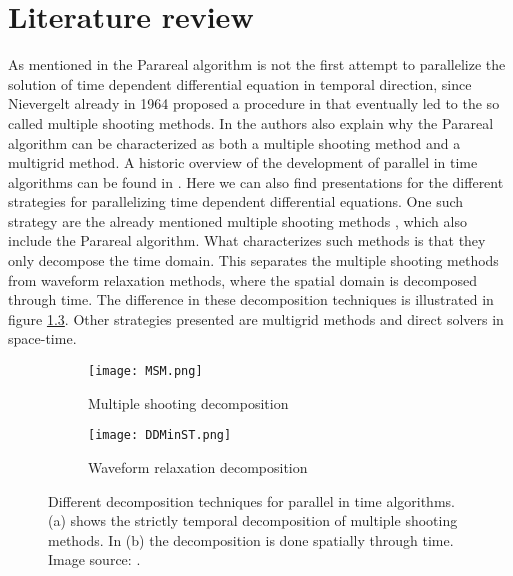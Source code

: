 \chapter{Literature review} \label{lit_chap}
As mentioned in \cite{gander2007superlinear} the Parareal algorithm is not the first attempt to parallelize the solution of time dependent differential equation in temporal direction, since Nievergelt already in 1964 proposed a procedure in \cite{nievergelt1964parallel} that eventually led to the so called multiple shooting methods. In \cite{gander2007superlinear} the authors also explain why the Parareal algorithm can be characterized as both a multiple shooting method and a multigrid method. A historic overview of the development of parallel in time algorithms can be found in \cite{gander201550}. Here we can also find presentations for the different strategies for parallelizing time dependent differential equations. One such strategy are the already mentioned multiple shooting methods \cite{nievergelt1964parallel,bellen1989parallel}, which also include the Parareal algorithm. What characterizes such methods is that they only decompose the time domain. This separates the multiple shooting methods from waveform relaxation methods\cite{lelarasmee1982waveform,gander1996overlapping}, where the spatial domain is decomposed through time. The difference in these decomposition techniques is illustrated in figure \ref{fig:fig}. Other strategies presented are multigrid \cite{hackbusch1985parabolic,lubich1987multi,horton1995space} methods and direct solvers in space-time\cite{miranker1967parallel,maday2008parallelization,guttel2013parallel}.
\\
\begin{figure}[h]
\centering
\begin{subfigure}{.5\textwidth}
  \centering
  \texttt{[image: MSM.png]}
  \caption{Multiple shooting decomposition}
  \label{fig:sfig1}
\end{subfigure}%
\begin{subfigure}{.5\textwidth}
  \centering
  \texttt{[image: DDMinST.png]}
  \caption{Waveform relaxation decomposition}
  \label{fig:sfig2}
\end{subfigure}
\caption{Different decomposition techniques for parallel in time algorithms. (a) shows the strictly temporal decomposition of multiple shooting methods. In (b) the decomposition is done spatially through time. Image source: \cite{gander201550}.}
\label{fig:fig}
\end{figure}
